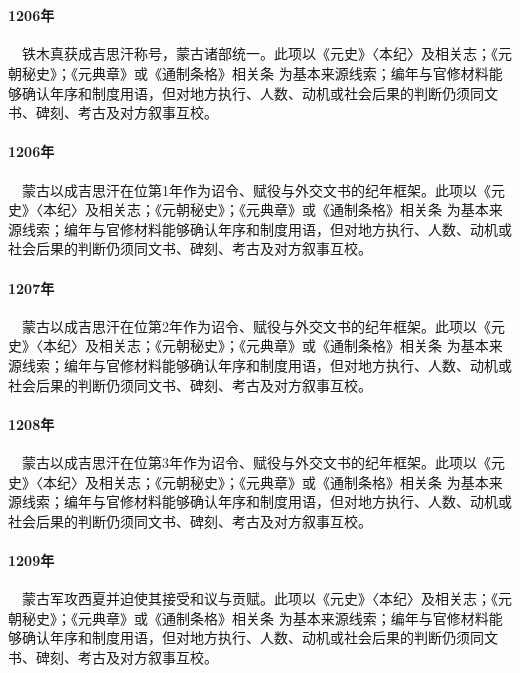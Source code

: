 \section{}

\paragraph{1206年}　铁木真获成吉思汗称号，蒙古诸部统一。此项以《元史》〈本纪〉及相关志；《元朝秘史》；《元典章》或《通制条格》相关条 为基本来源线索；编年与官修材料能够确认年序和制度用语，但对地方执行、人数、动机或社会后果的判断仍须同文书、碑刻、考古及对方叙事互校。

\paragraph{1206年}　蒙古以成吉思汗在位第1年作为诏令、赋役与外交文书的纪年框架。此项以《元史》〈本纪〉及相关志；《元朝秘史》；《元典章》或《通制条格》相关条 为基本来源线索；编年与官修材料能够确认年序和制度用语，但对地方执行、人数、动机或社会后果的判断仍须同文书、碑刻、考古及对方叙事互校。

\paragraph{1207年}　蒙古以成吉思汗在位第2年作为诏令、赋役与外交文书的纪年框架。此项以《元史》〈本纪〉及相关志；《元朝秘史》；《元典章》或《通制条格》相关条 为基本来源线索；编年与官修材料能够确认年序和制度用语，但对地方执行、人数、动机或社会后果的判断仍须同文书、碑刻、考古及对方叙事互校。

\paragraph{1208年}　蒙古以成吉思汗在位第3年作为诏令、赋役与外交文书的纪年框架。此项以《元史》〈本纪〉及相关志；《元朝秘史》；《元典章》或《通制条格》相关条 为基本来源线索；编年与官修材料能够确认年序和制度用语，但对地方执行、人数、动机或社会后果的判断仍须同文书、碑刻、考古及对方叙事互校。

\paragraph{1209年}　蒙古军攻西夏并迫使其接受和议与贡赋。此项以《元史》〈本纪〉及相关志；《元朝秘史》；《元典章》或《通制条格》相关条 为基本来源线索；编年与官修材料能够确认年序和制度用语，但对地方执行、人数、动机或社会后果的判断仍须同文书、碑刻、考古及对方叙事互校。

